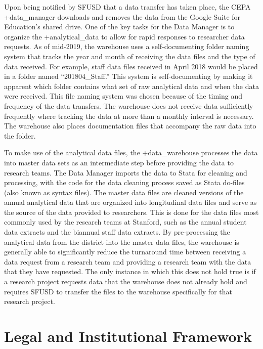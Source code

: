 \documentclass[
]{book}
\begin{document}
Upon being notified by SFUSD that a data transfer has taken place, the CEPA +data\_manager\textbar{} downloads and removes the data from the Google Suite for Education's shared drive. One of the key tasks for the Data Manager is to organize the +analytical\_data\textbar{} to allow for rapid responses to researcher data requests. As of mid-2019, the warehouse uses a self-documenting folder naming system that tracks the year and month of receiving the data files and the type of data received. For example, staff data files received in April 2018 would be placed in a folder named ``201804\_Staff.'' This system is self-documenting by making it apparent which folder contains what set of raw analytical data and when the data were received. This file naming system was chosen because of the timing and frequency of the data transfers. The warehouse does not receive data sufficiently frequently where tracking the data at more than a monthly interval is necessary. The warehouse also places documentation files that accompany the raw data into the folder.

To make use of the analytical data files, the +data\_warehouse\textbar{} processes the data into master data sets as an intermediate step before providing the data to research teams. The Data Manager imports the data to Stata for cleaning and processing, with the code for the data cleaning process saved as Stata do-files (also known as syntax files). The master data files are cleaned versions of the annual analytical data that are organized into longitudinal data files and serve as the source of the data provided to researchers. This is done for the data files most commonly used by the research teams at Stanford, such as the annual student data extracts and the biannual staff data extracts. By pre-processing the analytical data from the district into the master data files, the warehouse is generally able to significantly reduce the turnaround time between receiving a data request from a research team and providing a research team with the data that they have requested. The only instance in which this does not hold true is if a research project requests data that the warehouse does not already hold and requires SFUSD to transfer the files to the warehouse specifically for that research project.

\hypertarget{legal-and-institutional-framework-5}{%
\section{Legal and Institutional Framework}\label{legal-and-institutional-framework-5}}
\end{document}
